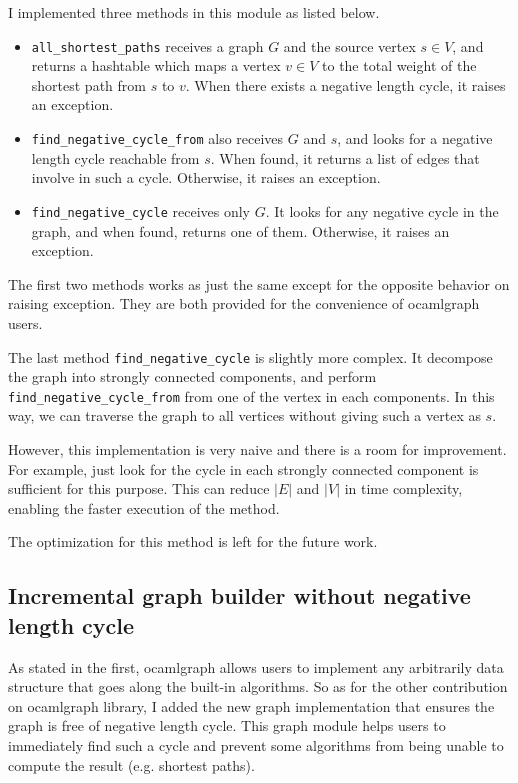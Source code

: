 \documentclass[a4paper,12pt]{article}
\begin{document}
I implemented three methods in this module as listed below.

\begin{itemize}
\item \texttt{all\_shortest\_paths} receives a graph $G$ and the
  source vertex $s\in V$, and returns a hashtable which maps a vertex
  $v\in V$ to the total weight of the shortest path from $s$ to
  $v$. When there exists a negative length cycle, it raises an
  exception.

\item \texttt{find\_negative\_cycle\_from} also receives $G$ and $s$,
  and looks for a negative length cycle reachable from $s$. When
  found, it returns a list of edges that involve in such a
  cycle. Otherwise, it raises an exception.

\item \texttt{find\_negative\_cycle} receives only $G$. It looks for
  any negative cycle in the graph, and when found, returns one of
  them. Otherwise, it raises an exception.
\end{itemize}

The first two methods works as just the same except for the opposite
behavior on raising exception.  They are both provided for the
convenience of ocamlgraph users.

The last method \texttt{find\_negative\_cycle} is slightly more
complex. It decompose the graph into strongly connected components,
and perform \texttt{find\_negative\_cycle\_from} from one of the
vertex in each components. In this way, we can traverse the graph to
all vertices without giving such a vertex as $s$.

However, this implementation is very naive and there is a room for
improvement. For example, just look for the cycle in each strongly
connected component is sufficient for this purpose. This can reduce
$|E|$ and $|V|$ in time complexity, enabling the faster execution of
the method.

The optimization for this method is left for the future work.

\subsection{Incremental graph builder without negative length cycle}

As stated in the first, ocamlgraph allows users to implement any
arbitrarily data structure that goes along the built-in algorithms. So
as for the other contribution on ocamlgraph library, I added the new
graph implementation that ensures the graph is free of negative length
cycle. This graph module helps users to immediately find such a cycle
and prevent some algorithms from being unable to compute the result
(e.g. shortest paths).
\end{document}
